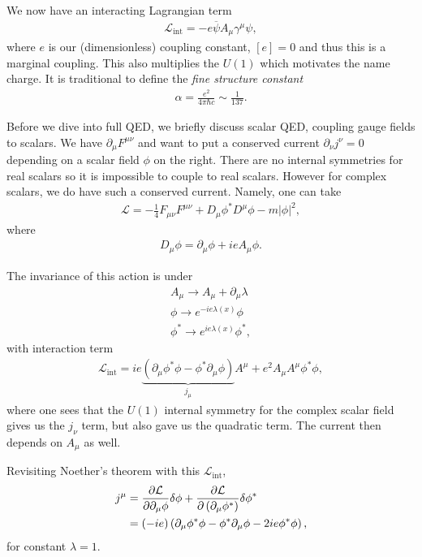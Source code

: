 
We now have an interacting Lagrangian term
\begin{align}
    \mathcal{L}_\text{int} = -e \overline{\psi} A_\mu \gamma^{\mu} \psi
,\end{align}
where $e$ is our (dimensionless) coupling constant, $\left[ e \right] = 0$ and thus this is a marginal coupling. This also multiplies the $U\left( 1 \right) $ which motivates the name charge. It is traditional to define the \textit{fine structure constant}
\begin{align}
    \alpha = \frac{e^2}{4\pi \hbar c} \sim \frac{1}{137}
.\end{align}

Before we dive into full QED, we briefly discuss scalar QED, coupling gauge fields to scalars. We have $\partial_\mu F^{\mu \nu}$ and want to put a conserved current $\partial_\nu j^{\nu} = 0$ depending on a scalar field $\phi$ on the right. There are no internal symmetries for real scalars so it is impossible to couple to real scalars. However for complex scalars, we do have such a conserved current. Namely, one can take
\begin{align}
    \mathcal{L} = -\frac{1}{4} F_{\mu \nu} F^{\mu \nu} + D_\mu \phi^{*} D^{\mu} \phi - m\left| \phi \right|^2
,\end{align}
where
\begin{align}
    D_\mu \phi = \partial_\mu \phi + i e A_\mu \phi
.\end{align}

The invariance of this action is under
\begin{align}
    A_\mu \to A_\mu + \partial_\mu \lambda \\
    \phi \to e^{-ie \lambda\left( x \right) } \phi \\
    \phi^{*} \to e^{i e \lambda \left( x \right) } \phi^{*}
,\end{align}
with interaction term
\begin{align}
    \mathcal{L}_\text{int} = i e \underbrace{\left( \partial_\mu \phi^{*} \phi - \phi^{*} \partial_\mu \phi \right)}_{j_\mu} A^{\mu} + e^2 A_\mu A^{\mu} \phi^{*} \phi 
,\end{align}
where one sees that the $U\left( 1 \right)$ internal symmetry for the complex scalar field gives us the $j_\nu$ term, but also gave us the quadratic term. The current then depends on $A_{\mu}$ as well.

Revisiting Noether's theorem with this $\mathcal{L}_\text{int}$,
\begin{align}
    j^{\mu} &= \pdv{\mathcal{L}}{\partial_\mu \phi} \delta \phi + \pdv{\mathcal{L}}{\left( \partial_\mu \phi^{*} \right) } \delta \phi^{*} \\
    &= \left( -ie \right) \left( \partial_\mu \phi^{*} \phi - \phi^{*} \partial_\mu \phi - 2i e \phi^{*} \phi\right) 
,\end{align}
for constant $\lambda = 1$.

